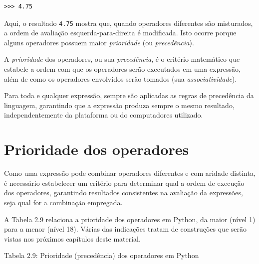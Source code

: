 \documentclass[
]{book}
\begin{document}
\begin{verbatim}
>>> 4.75
\end{verbatim}

Aqui, o resultado \texttt{4.75} mostra que, quando operadores diferentes são misturados, a ordem de avaliação esquerda-para-direita é modificada. Isto ocorre porque alguns operadores possuem maior \emph{prioridade} (ou \emph{precedência}).

A \emph{prioridade} dos operadores, ou sua \emph{precedência}, é o critério matemático que estabele a ordem com que os operadores serão executados em uma expressão, além de como os operadores envolvidos serão tomados (sua \emph{associatividade}).

Para toda e qualquer expressão, sempre são aplicadas as regras de precedência da linguagem, garantindo que a expressão produza sempre o mesmo resultado, independentemente da plataforma ou do computadores utilizado.

\hypertarget{comput-prior}{%
\section{Prioridade dos operadores}\label{comput-prior}}

Como uma expressão pode combinar operadores diferentes e com aridade distinta, é necessário estabelecer um critério para determinar qual a ordem de execução dos operadores, garantindo resultados consistentes na avaliação da expressões, seja qual for a combinação empregada.

A Tabela 2.9 relaciona a prioridade dos operadores em Python, da maior (nível 1) para a menor (nível 18). Várias das indicações tratam de construções que serão vistas nos próximos capítulos deste material.

Tabela 2.9: Prioridade (precedência) dos operadores em Python
\end{document}
